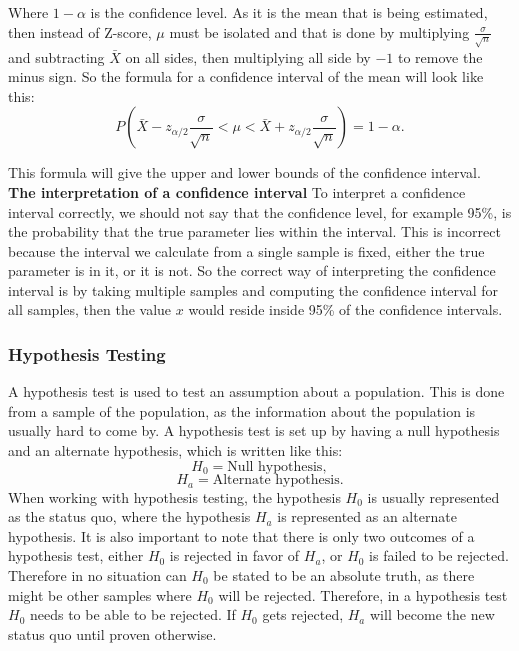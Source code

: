 \noindent Where $1-\alpha$ is the confidence level. As it is the mean that is being estimated, then instead of Z-score, $\mu$ must be isolated and that is done by multiplying $\frac{\sigma}{\sqrt{n}}$ and subtracting $\bar{X}$ on all sides, then multiplying all side by $-1$ to remove the minus sign. So the formula for a confidence interval of the mean will look like this:
\begin{equation}
P(\bar{X}-z_{\alpha/2}\frac{\sigma}{\sqrt{n}}<\mu<\bar{X}+z_{\alpha/2}\frac{\sigma}{\sqrt{n}})=1-\alpha.
\end{equation}

\noindent This formula will give the upper and lower bounds of the confidence interval.\\

\noindent \textbf{The interpretation of a confidence interval}
\newline
To interpret a confidence interval correctly, we should not say that the confidence level, for example 95\%, is the probability that the true parameter lies within the interval. This is incorrect because the interval we calculate from a single sample is fixed, either the true parameter is in it, or it is not. So the correct way of interpreting the confidence interval is by taking multiple samples and computing the confidence interval for all samples, then the value $x$ would reside inside 95\% of the confidence intervals\cite{ProbAndStat_8th}.


\subsubsection{Hypothesis Testing}
A hypothesis test is used to test an assumption about a population. This is done from a sample of the population, as the information about the population is usually hard to come by. A hypothesis test is set up by having a null hypothesis and an alternate hypothesis, which is written like this:
$$H_0 = \text{Null hypothesis},$$
$$H_a = \text{Alternate hypothesis}.$$
When working with hypothesis testing, the hypothesis $H_0$ is usually represented as the status quo, where the hypothesis $H_a$ is represented as an alternate hypothesis. It is also important to note that there is only two outcomes of a hypothesis test, either $H_0$ is rejected in favor of $H_a$, or $H_0$ is failed to be rejected. Therefore in no situation can $H_0$ be stated to be an absolute truth, as there might be other samples where $H_0$ will be rejected. Therefore, in a hypothesis test $H_0$ needs to be able to be rejected. If $H_0$ gets rejected, $H_a$ will become the new status quo until proven otherwise.\\

